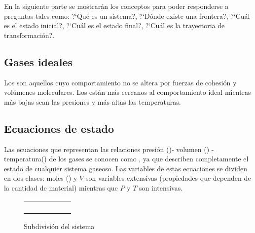 En la siguiente parte se mostrar\'an los conceptos para poder responderse a preguntas tales como: ?`Qu\'e es un sistema?, ?`D\'onde existe una frontera?, ?`Cu\'al es el estado inicial?, ?`Cu\'al es el estado final?, ?`Cu\'al es la trayectoria de transformaci\'on?.


\subsection{Gases ideales} 
Los  son aquellos cuyo comportamiento no se
altera por fuerzas de cohesi\'on y vol\'umenes moleculares. Los 
est\'an m\'as cercanos al comportamiento ideal mientras m\'as bajas sean las
presiones y m\'as altas las temperaturas.

\subsection{Ecuaciones de estado}

Las ecuaciones  que representan las relaciones presi\'on
()- volumen () -
temperatura() de los gases se conocen como , ya que describen completamente el estado de cualquier
sistema gaseoso. Las variables de estas ecuaciones se dividen en dos clases:
moles () y $V$ son variables extensivas (propiedades que dependen de la
cantidad de material) mientras que $P$ y $T$ son intensivas.

\begin{figure}[h]

\begin{center}
\begin{tabular}{||c|c|c|c|c|c||} \hline \hline
      &           &          &           &  & \\ \hline
      &           &          &           &  & \\ \hline
      &           &          &           &  & \\ \hline
      &           &          &           &  & \\ \hline
      &           &          &           &  &  \\ \hline \hline
\end{tabular}
\caption{Subdivisi\'on del sistema}
\label{fig:1}
\end{center}
\end{figure}


